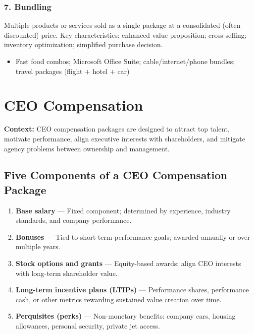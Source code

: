 \documentclass[11pt, letterpaper]{article}
\begin{document}
\subsubsection{7. Bundling}
Multiple products or services sold as a single package at a consolidated (often discounted) price.
Key characteristics: enhanced value proposition; cross-selling; inventory optimization; simplified purchase decision.
\begin{itemize}[leftmargin=*]
  \item Fast food combos; Microsoft Office Suite; cable/internet/phone bundles; travel packages (flight + hotel + car)
\end{itemize}

\newpage

\section{CEO Compensation}

\begin{defbox}
\textbf{Context:} CEO compensation packages are designed to attract top talent, motivate performance, align executive interests with shareholders, and mitigate agency problems between ownership and management.
\end{defbox}

\subsection{Five Components of a CEO Compensation Package}

\begin{enumerate}[leftmargin=*, label=\textbf{\arabic*.}]
  \item \textbf{Base salary} --- Fixed component; determined by experience, industry standards, and company performance.
  \item \textbf{Bonuses} --- Tied to short-term performance goals; awarded annually or over multiple years.
  \item \textbf{Stock options and grants} --- Equity-based awards; align CEO interests with long-term shareholder value.
  \item \textbf{Long-term incentive plans (LTIPs)} --- Performance shares, performance cash, or other metrics rewarding sustained value creation over time.
  \item \textbf{Perquisites (perks)} --- Non-monetary benefits: company cars, housing allowances, personal security, private jet access.
\end{enumerate}
\end{document}
